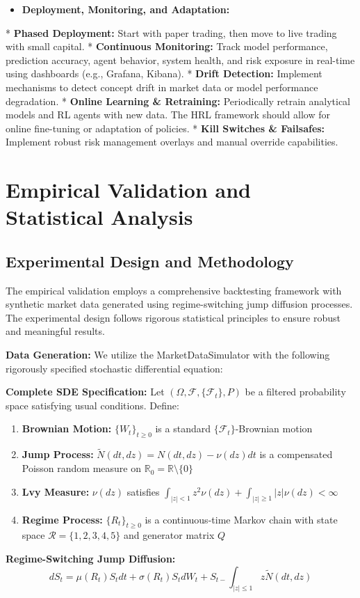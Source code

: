 \documentclass[11pt]{article}
\begin{document}
\begin{itemize}
\item   \textbf{Deployment, Monitoring, and Adaptation:}
\end{itemize}
    *   \textbf{Phased Deployment:} Start with paper trading, then move to live trading with small capital.
    *   \textbf{Continuous Monitoring:} Track model performance, prediction accuracy, agent behavior, system health, and risk exposure in real-time using dashboards (e.g., Grafana, Kibana).
    *   \textbf{Drift Detection:} Implement mechanisms to detect concept drift in market data or model performance degradation.
    *   \textbf{Online Learning \& Retraining:} Periodically retrain analytical models and RL agents with new data. The HRL framework should allow for online fine-tuning or adaptation of policies.
    *   \textbf{Kill Switches \& Failsafes:} Implement robust risk management overlays and manual override capabilities.

\section{Empirical Validation and Statistical Analysis}

\subsection{Experimental Design and Methodology}

The empirical validation employs a comprehensive backtesting framework with synthetic market data generated using regime-switching jump diffusion processes. The experimental design follows rigorous statistical principles to ensure robust and meaningful results.

\textbf{Data Generation:} We utilize the MarketDataSimulator with the following rigorously specified stochastic differential equation:

\textbf{Complete SDE Specification:}
Let $(\Omega, \mathcal{F}, \{\mathcal{F}_t\}, P)$ be a filtered probability space satisfying usual conditions. Define:

\begin{enumerate}
\item \textbf{Brownian Motion:} $\{W_t\}_{t \geq 0}$ is a standard $\{\mathcal{F}_t\}$-Brownian motion
\item \textbf{Jump Process:} $\tilde{N}(dt, dz) = N(dt, dz) - \nu(dz)dt$ is a compensated Poisson random measure on $\mathbb{R}_0 = \mathbb{R} \setminus \{0\}$
\item \textbf{Lvy Measure:} $\nu(dz)$ satisfies $\int_{|z|<1} z^2 \nu(dz) + \int_{|z| \geq 1} |z| \nu(dz) < \infty$
\item \textbf{Regime Process:} $\{R_t\}_{t \geq 0}$ is a continuous-time Markov chain with state space $\mathcal{R} = \{1,2,3,4,5\}$ and generator matrix $Q$

\end{enumerate}
\textbf{Regime-Switching Jump Diffusion:}
\begin{equation}
dS_t = \mu(R_t) S_t dt + \sigma(R_t) S_t dW_t + S_{t-} \int_{|z| \leq 1} z \tilde{N}(dt, dz)
\end{equation}
\end{document}
